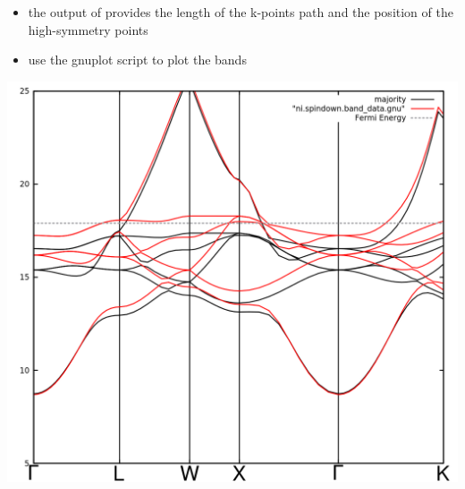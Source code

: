 \documentclass[landscape]{foils}
\begin{document}
\begin{itemize}
\begin{itemize}
\item the output of  provides the length of the k-points path and the position 
    of the high-symmetry points 
\item use the gnuplot script to plot the bands
\end{itemize}
\end{itemize}
\Head{}
\vfill
\begin{center}
  \includegraphics[width=14cm]{figs/bands_Ni_colinear.png}
\end{center}
\vfill
\end{document}
